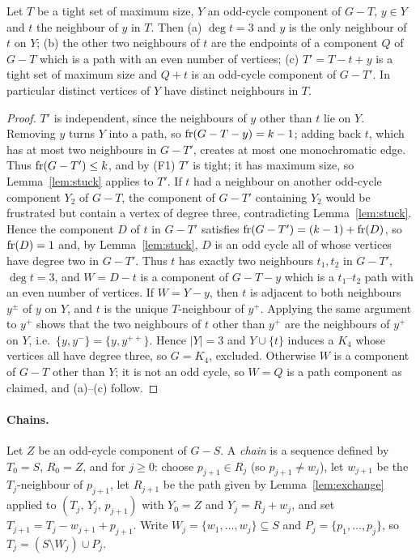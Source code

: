 \begin{lemma}[exchange]\label{lem:exchange}
Let $T$ be a tight set of maximum size, $Y$ an odd-cycle component of $G-T$, $y\in Y$ and $t$ the
neighbour of $y$ in $T$. Then
(a) $\deg t=3$ and $y$ is the only neighbour of $t$ on $Y$;
(b) the other two neighbours of $t$ are the endpoints of a component $Q$ of $G-T$ which is a path
with an even number of vertices;
(c) $T'=T-t+y$ is a tight set of maximum size and $Q+t$ is an odd-cycle component of $G-T'$.
In particular distinct vertices of $Y$ have distinct neighbours in $T$.
\end{lemma}
\begin{proof}
$T'$ is independent, since the neighbours of $y$ other than $t$ lie on $Y$. Removing $y$ turns $Y$
into a path, so $\operatorname{fr}(G-T-y)=k-1$; adding back $t$, which has at most two neighbours in
$G-T'$, creates at most one monochromatic edge. Thus $\operatorname{fr}(G-T')\le k$, and by (F1) $T'$ is tight;
it has maximum size, so Lemma~\ref{lem:stuck} applies to $T'$.
If $t$ had a neighbour on another odd-cycle component $Y_2$ of $G-T$, the component of $G-T'$
containing $Y_2$ would be frustrated but contain a vertex of degree three, contradicting
Lemma~\ref{lem:stuck}. Hence the component $D$ of $t$ in $G-T'$ satisfies
$\operatorname{fr}(G-T')=(k-1)+\operatorname{fr}(D)$, so $\operatorname{fr}(D)=1$ and, by Lemma~\ref{lem:stuck}, $D$ is an odd cycle all of
whose vertices have degree two in $G-T'$. Thus $t$ has exactly two neighbours $t_1,t_2$ in
$G-T'$, $\deg t=3$, and $W=D-t$ is a component of $G-T-y$ which is a $t_1$--$t_2$ path with an
even number of vertices.
If $W=Y-y$, then $t$ is adjacent to both neighbours $y^\pm$ of $y$ on $Y$, and $t$ is the unique
$T$-neighbour of $y^+$. Applying the same argument to $y^+$ shows that the two neighbours of $t$
other than $y^+$ are the neighbours of $y^+$ on $Y$, i.e.\ $\{y,y^-\}=\{y,y^{++}\}$. Hence $|Y|=3$
and $Y\cup\{t\}$ induces a $K_4$ whose vertices all have degree three, so $G=K_4$, excluded.
Otherwise $W$ is a component of $G-T$ other than $Y$; it is not an odd cycle, so $W=Q$ is a
path component as claimed, and (a)--(c) follow.
\end{proof}

\paragraph*{Chains.}
Let $Z$ be an odd-cycle component of $G-S$. A \emph{chain} is a sequence defined by
$T_0=S$, $R_0=Z$, and for $j\ge0$: choose $p_{j+1}\in R_j$ (so $p_{j+1}\ne w_j$), let $w_{j+1}$ be the
$T_j$-neighbour of $p_{j+1}$, let $R_{j+1}$ be the path given by Lemma~\ref{lem:exchange} applied
to $(T_j,\,Y_j,\,p_{j+1})$ with $Y_0=Z$ and $Y_j=R_j+w_j$, and set $T_{j+1}=T_j-w_{j+1}+p_{j+1}$.
Write $W_j=\{w_1,\dots,w_j\}\subseteq S$ and $P_j=\{p_1,\dots,p_j\}$, so $T_j=(S\setminus W_j)\cup P_j$.

